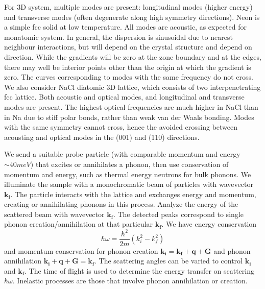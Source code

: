 \documentclass[a4paper]{article}
\begin{document}
\begin{eg}
For 3D system, multiple modes are present: longitudinal modes (higher energy) and transverse modes (often degenerate along high symmetry directions). Neon is a simple fcc solid at low temperature. All modes are acoustic, as expected for monatomic system. In general, the dispersion is sinusoidal due to nearest  neighbour interactions, but will depend on the crystal structure and depend on direction. While the gradients will be zero at the zone boundary and at the edges, there may well be interior points other than the origin at which the gradient is zero. The curves corresponding to modes with the same frequency do not cross.\\[5pt]
We also consider NaCl diatomic 3D lattice, which consists of two interpenetrating fcc lattice. Both acoustic and optical modes, and longitudinal and transverse modes are present. The highest optical frequencies are much higher in NaCl than in Na due to stiff polar bonds, rather than weak van der Waals bonding. Modes with the same symmetry cannot cross, hence the avoided crossing between acousting and optical modes in the (001) and (110) directions. 
\end{eg}
\begin{Note}
We send a suitable probe particle (with comparable momentum and energy $\sim40meV$) that excites or annihilates a phonon, then use conservation of momentum and energy, such as thermal energy neutrons for bulk phonons. We illuminate the sample with a monochromatic beam of particles with wavevector $\mathbf{k_i}$. The particle interacts with the lattice and exchanges energy and momentum, creating or annihilating phonons in this process. Analyze the energy of the scattered beam with wavevector $\mathbf{k_f}$. The detected peaks correspond to single phonon creation/annihilation at that particular $\mathbf{k_f}$. We have energy conservation
$$\hbar\omega=\frac{\hbar^2}{2m}(k_i^2-k_f^2)$$
and momentum conservation for phonon creation $\mathbf{k_i}=\mathbf{k_f}+\mathbf{q}+\mathbf{G}$ and phonon annihilation $\mathbf{k_i}+\mathbf{q}+\mathbf{G}=\mathbf{k_f}$. The scattering angles can be varied to control $\mathbf{k_i}$ and $\mathbf{k_f}$. The time of flight is used to determine the energy transfer on scattering $\hbar\omega$. Inelastic processes are those that involve phonon annihilation or creation.
\end{Note}
\newpage
\end{document}

